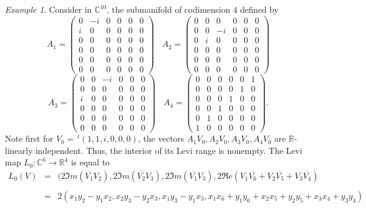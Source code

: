 \documentclass[12pt]{amsart}
\newcommand{\C}{\mathbb C}
\newcommand{\R}{\mathbb R}
\newcommand{\transp}{\,^t}
\theoremstyle{remark}
\theoremstyle{example}
\newtheorem{example}[theo]{Example}
\theoremstyle{definition}
\numberwithin{equation}{section}
\begin{document}
\begin{example}
Consider in $\C^{10}$, the submanifold of codimension $4$ defined by  
$$A_1=
\begin{pmatrix}
	0& -i & 0 & 0 & 0 & 0 \\ i &0 & 0 & 0 & 0 & 0 \\ 0 &0 & 0 & 0 & 0 & 0 \\ 0 &0 & 0 & 0 & 0 & 0 \\ 0 &0 & 0 & 0 & 0 & 0 \\ 0 &0 & 0 & 0 & 0 & 0
\end{pmatrix} \ \ \ \ 
A_2=
\begin{pmatrix}
	0& 0 & 0 & 0 & 0 & 0 \\ 0 &0 & -i & 0 & 0 & 0 \\ 0 &i & 0 & 0 & 0 & 0 \\ 0 &0 & 0 & 0 & 0 & 0 \\ 0 &0 & 0 & 0 & 0 & 0 \\ 0 &0 & 0 & 0 & 0 & 0
\end{pmatrix}$$
$$A_3=
\begin{pmatrix}
	0& 0 & -i & 0 & 0 & 0 \\ 0 &0 & 0 & 0 & 0 & 0 \\ i &0 & 0 & 0 & 0 & 0 \\ 0 &0 & 0 & 0 & 0 & 0 \\ 0 &0 & 0 & 0 & 0 & 0 \\ 0 &0 & 0 & 0 & 0 & 0
\end{pmatrix} \ \ \ \ 
 A_4=
\begin{pmatrix}
	0& 0 & 0 & 0 & 0 & 1 \\ 0 &0 & 0 & 0 & 1 & 0 \\ 0 &0 & 0 & 1 & 0 & 0 \\ 0 &0 & 1 & 0 & 0 & 0 \\ 0 &1 & 0 & 0 & 0 & 0 \\ 1 &0 & 0 & 0 & 0 & 0
\end{pmatrix}.$$
Note first for $V_0=\transp(1,1,i,0,0,0)$, the vectors $A_1V_0,A_2V_0,A_3V_0,A_4V_0$ are $\R$-linearly independent. Thus, the interior of its Levi range is nonempty. The Levi map $L_0: \C^6 \to \R^4$ is equal to
\begin{eqnarray*}
L_0(V)& =& (2\Im m (\overline{V_1}V_2),2\Im m (\overline{V_2}V_3),2\Im m (\overline{V_1}V_3),2\Re e (V_1\overline{V_6}+V_2\overline{V_5}+V_3\overline{V_4})\\
\\
& =& 2(x_1y_2-y_1x_2,x_2y_3-y_2x_3,x_1y_3-y_1x_3,x_1x_6+y_1y_6+x_2x_5+y_2y_5+x_3x_4+y_3y_4)\\

\end{eqnarray*}
\end{example}
\end{document}
